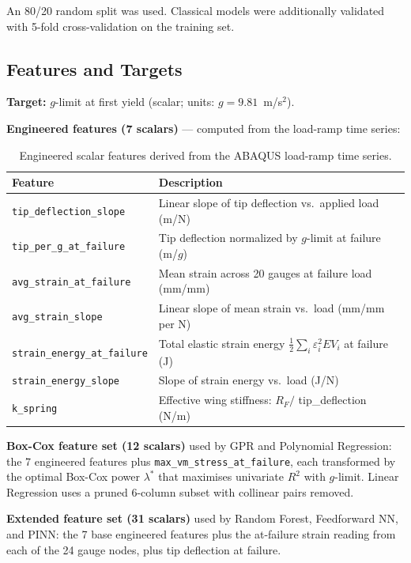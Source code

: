 \documentclass[10pt,letterpaper]{article}
\newcommand{\Rsq}{R^2}
\begin{document}
An 80/20 random split was used. Classical models were additionally validated with 5-fold
cross-validation on the training set.

\subsection{Features and Targets}

\textbf{Target:} $g$-limit at first yield (scalar; units: $g = 9.81$~m/s$^2$).

\textbf{Engineered features (7 scalars)} --- computed from the load-ramp time series:

\begin{table}[H]
  \caption{Engineered scalar features derived from the ABAQUS load-ramp time series.}
  \label{tab:features}
  \centering\small
  \begin{tabularx}{\textwidth}{@{}lX@{}}
    \toprule
    \textbf{Feature} & \textbf{Description} \\
    \midrule
    \texttt{tip\_deflection\_slope}
      & Linear slope of tip deflection vs.\ applied load (m/N) \\
    \texttt{tip\_per\_g\_at\_failure}
      & Tip deflection normalized by $g$-limit at failure (m/$g$) \\
    \texttt{avg\_strain\_at\_failure}
      & Mean strain across 20 gauges at failure load (mm/mm) \\
    \texttt{avg\_strain\_slope}
      & Linear slope of mean strain vs.\ load (mm/mm per N) \\
    \texttt{strain\_energy\_at\_failure}
      & Total elastic strain energy $\tfrac{1}{2}\sum_i \varepsilon_i^2 E V_i$
        at failure (J) \\
    \texttt{strain\_energy\_slope}
      & Slope of strain energy vs.\ load (J/N) \\
    \texttt{k\_spring}
      & Effective wing stiffness: $R_F /$ tip\_deflection (N/m) \\
    \bottomrule
  \end{tabularx}
\end{table}

\textbf{Box-Cox feature set (12 scalars)} used by GPR and Polynomial Regression: the 7
engineered features plus \texttt{max\_vm\_stress\_at\_failure}, each transformed by the
optimal Box-Cox power $\lambda^*$ that maximises univariate $\Rsq$ with $g$-limit. Linear
Regression uses a pruned 6-column subset with collinear pairs removed.

\textbf{Extended feature set (31 scalars)} used by Random Forest, Feedforward NN, and PINN:
the 7 base engineered features plus the at-failure strain reading from each of the 24 gauge
nodes, plus tip deflection at failure.
\end{document}
